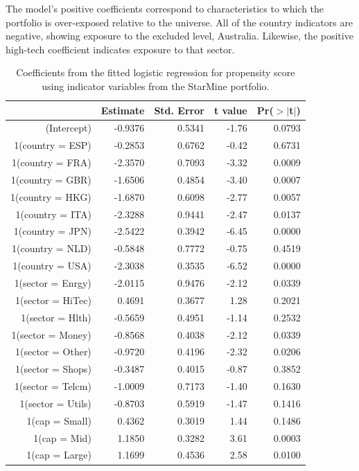 \documentclass{article}\usepackage{graphicx, color}
\begin{document}
The model's positive coefficients correspond to characteristics
to which the portfolio is over-exposed relative to the universe. All
of the country indicators are negative, showing exposure to the
excluded level, Australia. Likewise, the positive high-tech
coefficient indicates exposure to that sector.

\begin{table}[ht]
\centering
\begin{tabular}{rrrrr}
  \hline
 & Estimate & Std. Error & t value & Pr($>$$|$t$|$) \\ 
  \hline
(Intercept) & -0.9376 & 0.5341 & -1.76 & 0.0793 \\ 
  1(country = ESP) & -0.2853 & 0.6762 & -0.42 & 0.6731 \\ 
  1(country = FRA) & -2.3570 & 0.7093 & -3.32 & 0.0009 \\ 
  1(country = GBR) & -1.6506 & 0.4854 & -3.40 & 0.0007 \\ 
  1(country = HKG) & -1.6870 & 0.6098 & -2.77 & 0.0057 \\ 
  1(country = ITA) & -2.3288 & 0.9441 & -2.47 & 0.0137 \\ 
  1(country = JPN) & -2.5422 & 0.3942 & -6.45 & 0.0000 \\ 
  1(country = NLD) & -0.5848 & 0.7772 & -0.75 & 0.4519 \\ 
  1(country = USA) & -2.3038 & 0.3535 & -6.52 & 0.0000 \\ 
  1(sector = Enrgy) & -2.0115 & 0.9476 & -2.12 & 0.0339 \\ 
  1(sector = HiTec) & 0.4691 & 0.3677 & 1.28 & 0.2021 \\ 
  1(sector = Hlth) & -0.5659 & 0.4951 & -1.14 & 0.2532 \\ 
  1(sector = Money) & -0.8568 & 0.4038 & -2.12 & 0.0339 \\ 
  1(sector = Other) & -0.9720 & 0.4196 & -2.32 & 0.0206 \\ 
  1(sector = Shops) & -0.3487 & 0.4015 & -0.87 & 0.3852 \\ 
  1(sector = Telcm) & -1.0009 & 0.7173 & -1.40 & 0.1630 \\ 
  1(sector = Utils) & -0.8703 & 0.5919 & -1.47 & 0.1416 \\ 
  1(cap = Small) & 0.4362 & 0.3019 & 1.44 & 0.1486 \\ 
  1(cap = Mid) & 1.1850 & 0.3282 & 3.61 & 0.0003 \\ 
  1(cap = Large) & 1.1699 & 0.4536 & 2.58 & 0.0100 \\ 
   \hline
\end{tabular}
\caption{Coefficients from the fitted logistic regression for propensity score using indicator variables from the StarMine portfolio.} 
\label{TablePropensityScore}
\end{table}
\end{document}

